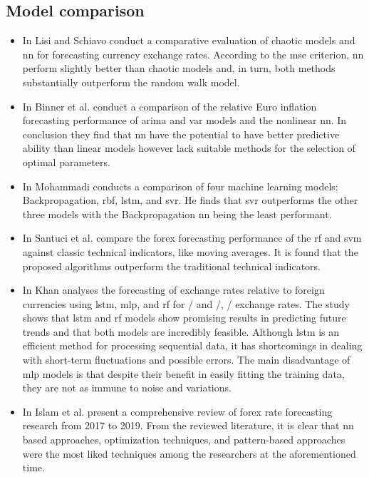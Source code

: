 \subsection{Model comparison}\label{Model comparison}

\begin{itemize}
    \item In \cite{nn-vs-chaotic} Lisi and Schiavo conduct a comparative evaluation of chaotic models and \gls{nn} for forecasting currency exchange rates. According to the \gls{mse} criterion, \gls{nn} perform slightly better than chaotic models and, in turn, both methods substantially outperform the random walk model.
    \item In \cite{linear-vs-nn} Binner et al. conduct a comparison of the relative Euro inflation forecasting performance of \gls{arima} and \gls{var} models and the nonlinear \gls{nn}. In conclusion they find that \gls{nn} have the potential to have better predictive ability than linear models however lack suitable methods for the selection of optimal parameters.
    \item In \cite{techniques} Mohammadi conducts a comparison of four machine learning models; Backpropagation, \gls{rbf}, \gls{lstm}, and \gls{svr}. He finds that \gls{svr} outperforms the other three models with the Backpropagation \gls{nn} being the least performant.
    \item In \cite{rf-svm} Santuci et al. compare the \gls{forex} forecasting performance of the \gls{rf} and \gls{svm} against classic technical indicators, like moving averages. It is found that the proposed algorithms outperform the traditional technical indicators.
    \item In \cite{lstm-mlp-rf} Khan analyses the forecasting of exchange rates relative to foreign currencies using \gls{lstm}, \gls{mlp}, and \gls{rf} for / and /, / exchange rates. The study shows that \gls{lstm} and \gls{rf} models show promising results in predicting future trends and that both models are incredibly feasible. Although \gls{lstm} is an efficient method for processing sequential data, it has shortcomings in dealing with short-term fluctuations and possible errors. The main disadvantage of \gls{mlp} models is that despite their benefit in easily fitting the training data, they are not as immune to noise and variations.
    \item In \cite{review} Islam et al. present a comprehensive review of \gls{forex} rate forecasting research from 2017 to 2019. From the reviewed literature, it is clear that \gls{nn} based approaches, optimization techniques, and pattern-based approaches were the most liked techniques among the researchers at the aforementioned time.
\end{itemize}

